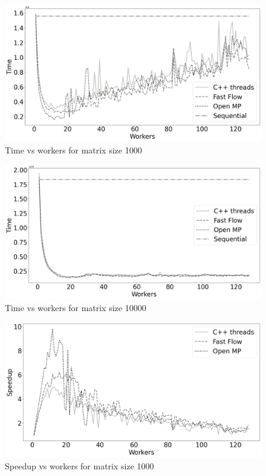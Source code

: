 \documentclass[12pt]{article}
\begin{document}
	\begin{figure}[H]
		\centering
		\includegraphics[width=13cm]{./images/time_vs_cores_1000}
		\caption{Time vs workers for matrix size 1000}
	\end{figure}
	
	\begin{figure}[H]
		\centering
		\includegraphics[width=13cm]{./images/time_vs_cores_10000}
		\caption{Time vs workers for matrix size 10000}
	\end{figure}

	\begin{figure}[H]
		\centering
		\includegraphics[width=13cm]{./images/speedup_vs_cores_1000}
		\caption{Speedup vs workers for matrix size 1000}
	\end{figure}
\end{document}
